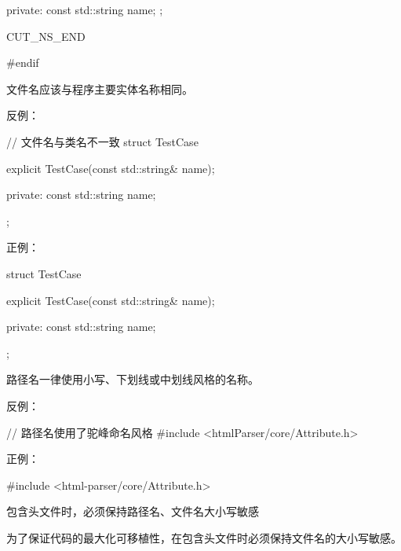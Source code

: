 \begin{content}
\begin{leftbar}
\begin{c++}[caption={\ttfamily{cut/core/TestCase.h}}]
{private:
    const std::string name;
};

CUT_NS_END

#endif
\end{c++}
\end{leftbar}

\begin{regulation}
文件名应该与程序主要实体名称相同。
\end{regulation}

反例：
\begin{leftbar}
\begin{c++}[caption={\ttfamily{cut/core/test\_case.h}}]
// 文件名与类名不一致
struct TestCase
{
    explicit TestCase(const std::string& name);

private:
    const std::string name;
};
\end{c++}
\end{leftbar}

正例：
\begin{leftbar}
\begin{c++}[caption={\ttfamily{cut/core/TestCase.h}}]
struct TestCase
{
    explicit TestCase(const std::string& name);

private:
    const std::string name;
};
\end{c++}
\end{leftbar}

\begin{regulation}
路径名一律使用小写、下划线或中划线风格的名称。
\end{regulation}

反例：
\begin{leftbar}
\begin{c++}[caption={驼峰风格的路径名}]
// 路径名使用了驼峰命名风格
#include <htmlParser/core/Attribute.h>
\end{c++}
\end{leftbar}

正例：
\begin{leftbar}
\begin{c++}[caption={正确的头文件包含}]
#include <html-parser/core/Attribute.h>
\end{c++}
\end{leftbar}

\begin{regulation}
包含头文件时，必须保持路径名、文件名大小写敏感
\end{regulation}

为了保证代码的最大化可移植性，在包含头文件时必须保持文件名的大小写敏感。


\end{content}
